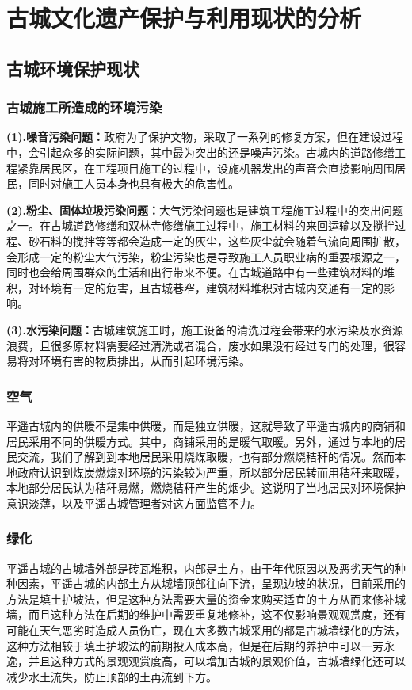 \documentclass[UTF8]{ctexart}
\begin{document}
\section{古城文化遗产保护与利用现状的分析}
    \subsection{古城环境保护现状}
        \subsubsection{古城施工所造成的环境污染}
\textbf{(1).噪音污染问题：}政府为了保护文物，采取了一系列的修复方案，但在建设过程中，会引起众多的实际问题，其中最为突出的还是噪声污染。古城内的道路修缮工程紧靠居民区，在工程项目施工的过程中，设施机器发出的声音会直接影响周围居民，同时对施工人员本身也具有极大的危害性。

\textbf{(2).粉尘、固体垃圾污染问题：}大气污染问题也是建筑工程施工过程中的突出问题之一。在古城道路修缮和双林寺修缮施工过程中，施工材料的来回运输以及搅拌过程、砂石料的搅拌等等都会造成一定的灰尘，这些灰尘就会随着气流向周围扩散，会形成一定的粉尘大气污染，粉尘污染也是导致施工人员职业病的重要根源之一，同时也会给周围群众的生活和出行带来不便。在古城道路中有一些建筑材料的堆积，对环境有一定的危害，且古城巷窄，建筑材料堆积对古城内交通有一定的影响。

\textbf{(3).水污染问题：}古城建筑施工时，施工设备的清洗过程会带来的水污染及水资源浪费，且很多原材料需要经过清洗或者混合，废水如果没有经过专门的处理，很容易将对环境有害的物质排出，从而引起环境污染。
        \subsubsection{空气}
平遥古城内的供暖不是集中供暖，而是独立供暖，这就导致了平遥古城内的商铺和居民采用不同的供暖方式。其中，商铺采用的是暖气取暖。另外，通过与本地的居民交流，我们了解到到本地居民采用烧煤取暖，也有部分燃烧秸秆的情况。然而本地政府认识到煤炭燃烧对环境的污染较为严重，所以部分居民转而用秸秆来取暖，本地部分居民认为秸秆易燃，燃烧秸秆产生的烟少。这说明了当地居民对环境保护意识淡薄，以及平遥古城管理者对这方面监管不力。
        \subsubsection{绿化}
平遥古城的古城墙外部是砖瓦堆积，内部是土方，由于年代原因以及恶劣天气的种种因素，平遥古城的内部土方从城墙顶部往向下流，呈现边坡的状况，目前采用的方法是填土护坡法，但是这种方法需要大量的资金来购买适宜的土方从而来修补城墙，而且这种方法在后期的维护中需要重复地修补，这不仅影响景观观赏度，还有可能在天气恶劣时造成人员伤亡，现在大多数古城采用的都是古城墙绿化的方法，这种方法相较于填土护坡法的前期投入成本高，但是在后期的养护中可以一劳永逸，并且这种方式的景观观赏度高，可以增加古城的景观价值，古城墙绿化还可以减少水土流失，防止顶部的土再流到下方。
\end{document}
